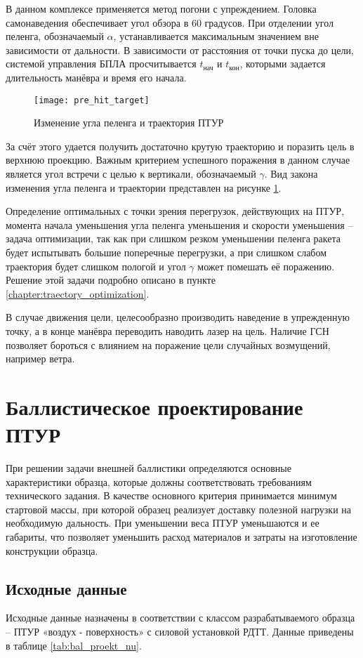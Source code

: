 В данном комплексе применяется метод погони с упреждением. Головка самонаведения обеспечивает угол обзора в 60 градусов. При отделении угол пеленга, обозначаемый $\alpha$, устанавливается максимальным значением вне зависимости от дальности. В зависимости от расстояния от точки пуска до цели, системой управления БПЛА просчитывается $t_{\text{нач}}$ и $t_{\text{кон}}$, которыми задается длительность манёвра и время его начала.
\begin{figure}[!h]
	\texttt{[image: pre\_hit\_target]}
	\caption{Изменение угла пеленга и траектория ПТУР}
	\label{fig:pre_hit_target}
\end{figure}

За счёт этого удается получить достаточно крутую траекторию и поразить цель в верхнюю проекцию. Важным критерием успешного поражения в данном случае является угол встречи с целью к вертикали, обозначаемый $\gamma$. Вид закона изменения угла пеленга и траектории представлен на рисунке \ref{fig:pre_hit_target}.

Определение оптимальных с точки зрения перегрузок, действующих на ПТУР, момента начала уменьшения угла пеленга уменьшения и скорости уменьшения – задача оптимизации, так как при слишком резком уменьшении пеленга ракета будет испытывать большие поперечные перегрузки, а при слишком слабом траектория будет слишком пологой и угол $\gamma$ может помешать её поражению. Решение этой задачи подробно описано в пункте \ref{chapter:traectory_optimization}.

В случае движения цели, целесообразно производить наведение в упрежденную точку, а в конце манёвра переводить наводить лазер на цель.
Наличие ГСН позволяет бороться с влиянием на поражение цели случайных возмущений, например ветра.

\clearpage
\section{Баллистическое проектирование ПТУР}
При решении задачи внешней баллистики определяются основные характеристики образца, которые должны соответствовать требованиям технического задания. В качестве основного критерия принимается минимум стартовой массы, при которой образец реализует доставку полезной нагрузки на необходимую дальность. При уменьшении веса ПТУР уменьшаются и ее габариты, что позволяет уменьшить расход материалов и затраты на изготовление конструкции образца.
\subsection{Исходные данные}
Исходные данные назначены в соответствии с классом разрабатываемого образца – ПТУР «воздух - поверхность» с силовой установкой РДТТ. Данные приведены в таблице \ref{tab:bal_proekt_nu}.

